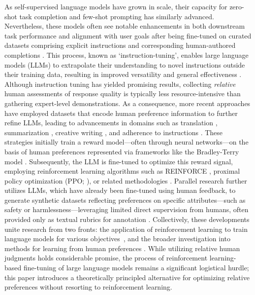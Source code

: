 As self-supervised language models have grown in scale, their capacity for zero-shot task completion \citep{radford2019language} and few-shot prompting \citep{gpt3,megatron,chowdhery2022palm} has similarly advanced. Nevertheless, these models often see notable enhancements in both downstream task performance and alignment with user goals after being fine-tuned on curated datasets comprising explicit instructions and corresponding human-authored completions \citep{mishra-etal-2022-cross,sanh2022multitask,chung2022scaling,thoppilan2022lamda}. This process, known as `instruction-tuning', enables large language models (LLMs) to extrapolate their understanding to novel instructions outside their training data, resulting in improved versatility and general effectiveness \citep{chung2022scaling}. Although instruction tuning has yielded promising results, collecting \textit{relative} human assessments of response quality is typically less resource-intensive than gathering expert-level demonstrations. As a consequence, more recent approaches have employed datasets that encode human preference information to further refine LLMs, leading to advancements in domains such as translation \citep{kreutzer-etal-2018-reliability}, summarization \citep{stiennon2022learning,ziegler2020finetuning}, creative writing \citep{ziegler2020finetuning}, and adherence to instructions \citep{ouyang2022training,ramamurthy2023is}. These strategies initially train a reward model—often through neural networks—on the basis of human preferences represented via frameworks like the Bradley-Terry model \citep{bradley1952rankanalysis}. Subsequently, the LLM is fine-tuned to optimize this reward signal, employing reinforcement learning algorithms such as REINFORCE \citep{williams1992reinforce}, proximal policy optimization (PPO; \cite{schulman2017proximal}), or related methodologies \citep{ramamurthy2023is}. Parallel research further utilizes LLMs, which have already been fine-tuned using human feedback, to generate synthetic datasets reflecting preferences on specific attributes—such as safety or harmlessness—leveraging limited direct supervision from humans, often provided only as textual rubrics for annotation \citep{bai2022constitutional}. Collectively, these developments unite research from two fronts: the application of reinforcement learning to train language models for various objectives~\citep{Ranzato2015SequenceLT,paulus2018a,wu2018learning}, and the broader investigation into methods for learning from human preferences \citep{christiano2017deep,kupcsik2018learning}. While utilizing relative human judgments holds considerable promise, the process of reinforcement learning-based fine-tuning of large language models remains a significant logistical hurdle; this paper introduces a theoretically principled alternative for optimizing relative preferences without resorting to reinforcement learning.

